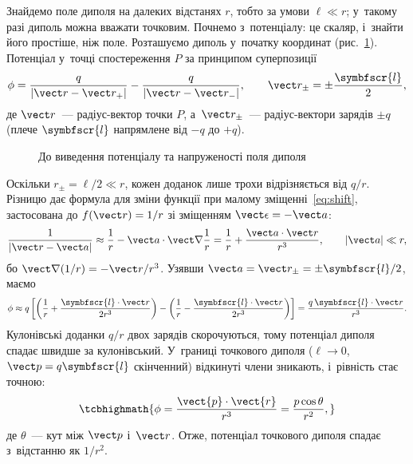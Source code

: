 Знайдемо поле диполя на далеких відстанях $r$, тобто за умови $\ell \ll r$; у~такому разі
диполь можна вважати точковим. Почнемо з~потенціалу: це скаляр, і~знайти його простіше, ніж
поле. Розташуємо диполь у~початку координат (рис.~\ref{tikz:dipolefield}). Потенціал
у~точці спостереження $P$ за принципом суперпозиції
\begin{equation*}
	\phi = \frac{q}{|\vect r-\vect r_+|} - \frac{q}{|\vect r-\vect r_-|},\qquad
	\vect r_\pm = \pm\frac{\symbfscr{l}}{2},
\end{equation*}
де $\vect r$~--- радіус-вектор точки $P$, а~$\vect r_\pm$~--- радіус-вектори зарядів $\pm q$
(плече $\symbfscr{l}$ напрямлене від $-q$ до $+q$).

\begin{figure}
	\centering
	\caption{До виведення потенціалу та напруженості поля диполя}
	\label{tikz:dipolefield}
\end{figure}

Оскільки $r_\pm=\ell/2\ll r$, кожен доданок лише трохи відрізняється від $q/r$. Різницю дає формула
для зміни функції при малому зміщенні~\eqref{eq:shift}, застосована до $f(\vect r)=1/r$
зі зміщенням $\vect\epsilon=-\vect a$:
\begin{equation}\label{eq:shift_first_order}
	\frac1{|\vect r-\vect a|} \approx \frac1r - \vect a\cdot\vect\nabla\frac1r
	= \frac1r + \frac{\vect a\cdot\vect r}{r^3},\qquad |\vect a|\ll r,
\end{equation}
бо $\vect\nabla(1/r) = -\vect r/r^3$. Узявши $\vect a=\vect r_\pm=\pm\symbfscr{l}/2$, маємо
\begin{equation*}
	\phi \approx q\left[\left(\frac1r+\frac{\symbfscr{l}\cdot\vect r}{2r^3}\right)-\left(\frac1r-\frac{\symbfscr{l}\cdot\vect r}{2r^3}\right)\right]
	= \frac{q\,\symbfscr{l}\cdot\vect r}{r^3}.
\end{equation*}
Кулонівські доданки $q/r$ двох зарядів скорочуються, тому потенціал диполя спадає швидше за
кулонівський. У~границі точкового диполя ($\ell\to0$, $\vect p=q\symbfscr{l}$ скінченний)
відкинуті члени зникають, і~рівність стає точною:
\begin{equation}\label{eq:potential_dipole}
	\tcbhighmath{
		\phi = \frac{\vect{p}\cdot\vect{r}}{r^3} = \frac{p\cos\theta}{r^2},
	}
\end{equation}
де $\theta$~--- кут між $\vect p$ і~$\vect r$. Отже, потенціал точкового диполя спадає
з~відстанню як $1/r^2$.

